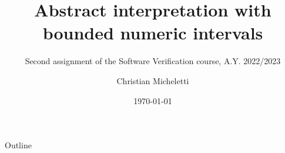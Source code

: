 \documentclass{beamer}
\title{Abstract interpretation with bounded numeric intervals}
\subtitle{Second assignment of the Software Verification course, A.Y. 2022/2023}
\author{Christian Micheletti}
\date{\today}
\begin{document}
	\maketitle

	\begin{frame}{Outline}
		\tableofcontents
	\end{frame}

    
	
	
\end{document}
